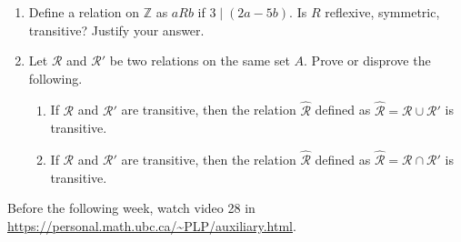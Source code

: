 \documentclass[12pt]{article}
\begin{document}
\begin{enumerate}[resume]
\item Define a relation on $\mathbb Z$ as $a R b$ if $3\mid (2a-5b)$. Is $R$ reflexive, symmetric, transitive? Justify your answer.


\item Let $\mathcal R$ and $\mathcal R'$ be two relations on the same set $A$. Prove or disprove the following.
\begin{enumerate}
\item If $\mathcal R$ and $\mathcal R'$ are transitive, then the relation $\widehat{\mathcal R}$ defined as $\widehat{\mathcal R}=\mathcal R \cup\mathcal R'$ is transitive.
\item If $\mathcal R$ and $\mathcal R'$ are transitive, then the relation $\widehat{\mathcal R}$ defined as $\widehat{\mathcal R}=\mathcal R \cap\mathcal R'$ is transitive.
\end{enumerate}

\end{enumerate}

Before the following week, watch video 28 in \url{https://personal.math.ubc.ca/~PLP/auxiliary.html}.
\end{document}
